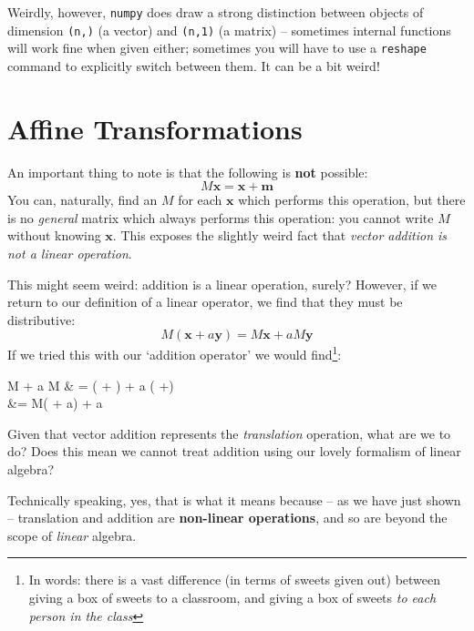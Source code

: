 \documentclass[a4paper,openany,11pt]{book}
\renewcommand\vec[1]{\boldsymbol{\mathbf{#1}}}
\begin{document}
					Weirdly, however, \verb|numpy| does draw a strong distinction between objects of dimension \verb|(n,)| (a vector) and \verb|(n,1)| (a matrix) -- sometimes internal functions will work fine when given either; sometimes you will have to use a \verb|reshape| command to explicitly switch between them. It can be a bit weird!

		
	
				\section{Affine Transformations}

					An important thing to note is that the following is \textbf{not} possible:
					\begin{equation}
						M \vec{x} = \vec{x} + \vec{m} 
					\end{equation}
					You can, naturally, find an $M$ for each $\vec{x}$ which performs this operation, but there is no \textit{general} matrix which always performs this operation: you cannot write $M$ without knowing $\vec{x}$. This exposes the slightly weird fact that \textit{vector addition is not a linear operation}. 
					
					This might seem weird: addition is a linear operation, surely? However, if we return to our definition of a linear operator, we find that they must be distributive:
					\begin{equation}
						M\left( \vec{x} + a\vec{y}\right) = M \vec{x} + a M\vec{y} 
					\end{equation}
					If we tried this with our `addition operator' we would find\footnote{In words: there is a vast difference (in terms of sweets given out) between giving a box of sweets to a classroom, and giving a box of sweets \textit{to each person in the class}}:
					\begin{spalign}
						M \vec{x} + a M\vec{y} & = \left(\vec{x} + \vec{m}\right) + a \left( \vec{y} +\vec{m}\right) 
						\\
						&= M\left( \vec{x} + a\vec{y}\right) + a\vec{y}
					\end{spalign}
					 Given that vector addition represents the \textit{translation} operation, what are we to do? Does this mean we cannot treat addition using our lovely formalism of linear algebra?
					
					Technically speaking, yes, that is what it means because -- as we have just shown -- translation and addition are \textbf{non-linear operations}, and so are beyond the scope of \textit{linear} algebra.
\end{document}
